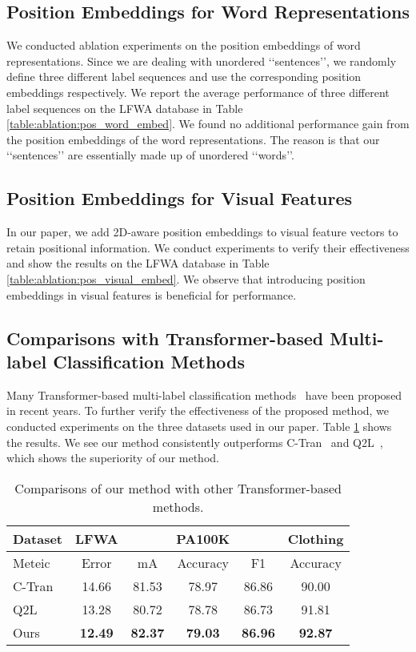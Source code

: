\documentclass[runningheads]{llncs}
\begin{document}
\subsection{Position Embeddings for Word Representations}
We conducted ablation experiments on the position embeddings of word representations. Since we are dealing with unordered ‘‘sentences’’, we randomly define three different label sequences and use the corresponding position embeddings respectively. We report the average performance of  three different label sequences on the LFWA database in Table \ref{table:ablation:pos_word_embed}. We found no additional performance gain from the position embeddings of the word representations. The reason is that our ‘‘sentences’’ are essentially made up of unordered ‘‘words’’.





\subsection{Position Embeddings for Visual Features}
In our paper, we add 2D-aware position embeddings to visual feature vectors to retain positional information. We conduct experiments to verify their effectiveness and show the results on the LFWA database in Table \ref{table:ablation:pos_visual_embed}. We observe that introducing position embeddings in visual features is beneficial for performance.

\subsection{Comparisons with Transformer-based Multi-label Classification Methods}
Many Transformer-based multi-label classification methods~\cite{lanchantin2021general,liu2021query2label} have been proposed in recent years. To further verify the effectiveness of the proposed method, we conducted experiments on the three datasets used in our paper. Table \ref{table:comparison1} shows the results. We see our method consistently outperforms C-Tran~\cite{lanchantin2021general} and Q2L~\cite{liu2021query2label}, which shows the superiority of our method.

\begin{table}[t]
\caption{Comparisons of our method with other Transformer-based methods. }
\begin{center}
\renewcommand\tabcolsep{10pt}
\begin{tabular}{l|c|c|c|c|c}
\hline\hline
Dataset  & LFWA  &\multicolumn{3}{c|}{PA100K} & Clothing\\
\hline
Meteic & Error & mA & Accuracy & F1 & Accuracy\\
\hline 
C-Tran \cite{lanchantin2021general} & 14.66 &  81.53 & 78.97  &  86.86 &  90.00  \\
Q2L \cite{liu2021query2label} & 13.28 &  80.72  &  78.78 &  86.73 &  91.81 \\
\hline
Ours & \textbf{12.49} & \textbf{82.37} &  \textbf{79.03} & \textbf{86.96} &  \textbf{92.87} \\
\hline\hline
\end{tabular}
\end{center}
\label{table:comparison1}
\end{table}
\end{document}

